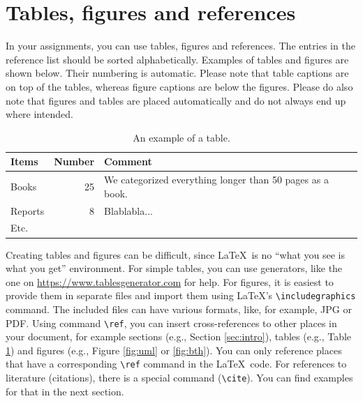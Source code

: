 \documentclass[12pt,a4paper]{article}
\begin{document}
\section{Tables, figures and references}
\label{sec:tab}
In your assignments, you can use tables, figures and references. The entries in the reference list should be sorted alphabetically. Examples of tables and figures are shown below. Their numbering is automatic. Please note that table captions are on top of the tables, whereas figure captions are below the figures.
Please do also note that figures and tables are placed automatically and do not always end up where intended.

\begin{table}[hbt]
\centering
\caption{An example of a table.}
\label{tab:ex}
\begin{tabular}{|l|r|p{6cm}|}
\hline
\textbf{Items} & \textbf{Number} & \textbf{Comment} \\
\hline
Books & 25 & We categorized everything longer than 50 pages as a book. \\
\hline
Reports & 8 & Blablabla... \\ 
\hline
Etc. & & \\
\hline 
\end{tabular}
\end{table}

Creating tables and figures can be difficult, since \LaTeX\ is no ``what you see is what you get'' environment. For simple tables, you can use generators, like the one on  \url{https://www.tablesgenerator.com} for help. For figures, it is easiest to provide them in separate files and import them using \LaTeX's \texttt{\textbackslash includegraphics} command. The included files can have various formats, like, for example, JPG or PDF.
Using command \texttt{\textbackslash ref}, you can insert cross-references to other places in your document, for example sections (e.g., Section \ref{sec:intro}), tables (e.g., Table \ref{tab:ex}) and figures (e.g., Figure \ref{fig:uml} or \ref{fig:bth}). You can only reference places that have a corresponding \texttt{\textbackslash ref} command in the \LaTeX\ code. For references to literature (citations), there is a special command (\texttt{\textbackslash cite}). You can find examples for that in the next section.
\end{document}
